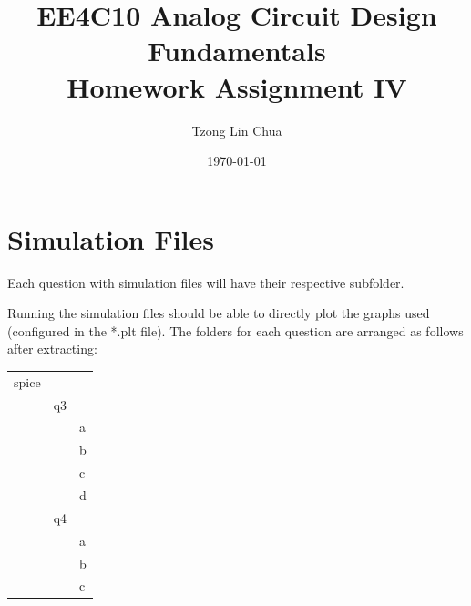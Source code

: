\documentclass{article}
\author{Tzong Lin Chua}
\date{\today}
\title{EE4C10 Analog Circuit Design Fundamentals\\\medskip
\large Homework Assignment IV }
\begin{document}
\maketitle
\tableofcontents


\section{Simulation Files}
\label{sec:orge015c8c}
Each question with simulation files will have their respective subfolder.

Running the simulation files should be able to directly plot the graphs used (configured in the *.plt file).
The folders for each question are arranged as follows after extracting:

\begin{center}
\begin{tabular}{lll}
\hline
spice &  & \\
 & q3 & \\
 &  & a\\
 &  & b\\
 &  & c\\
 &  & d\\
 & q4 & \\
 &  & a\\
 &  & b\\
 &  & c\\
\hline
\end{tabular}
\end{center}
\end{document}
